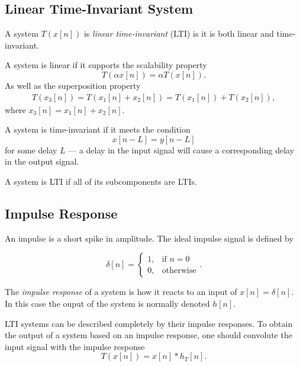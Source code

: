 \documentclass{article}
\def\lsqb{\left[}
\def\rsqb{\right]}
\def\sqb#1{\lsqb #1 \rsqb}
\def\xsig{x\sqb{n}}
\begin{document}
\subsection{Linear Time-Invariant System}

A system $T(x\sqb{n})$ is \textit{linear time-invariant} (LTI) is it is both linear and time-invariant.

A system is linear if it supports the scalability property 
\begin{equation}
    T(\alpha \xsig) = \alpha T(\xsig).
\end{equation}
As well as the superposition property 
\begin{gather}
    T(x_3\sqb{n}) = T(x_1\sqb{n} + x_2\sqb{n}) =  T(x_1\sqb{n}) + T(x_2\sqb{n}), 
\end{gather}
where $x_3\sqb{n} = x_1\sqb{n} + x_2\sqb{n}$.

A system is time-invariant if it meets the condition
\begin{equation}
    x\sqb{n - L} = y\sqb{n - L}
\end{equation}
for some delay $L$ --- a delay in the input signal will cause a corresponding delay in the output signal.

A system is LTI if all of its subcomponents are LTIs.

\subsection{Impulse Response}
An impulse is a short spike in amplitude. The ideal impulse signal is defined by

\begin{equation}
    \delta\sqb{n} =
        \begin{cases}
            1, & \text{if } n = 0 \\
            0, & \text{otherwise}
        \end{cases}.
\end{equation}

The \textit{impulse response} of a system is how it reacts to an input of $\xsig = \delta\sqb{n}$. In this
case the ouput of the system is normally denoted $h\sqb{n}$.

LTI systems can be described completely by their impulse responses. To obtain the output of a system based on an impulse response, one should convolute the input signal with the impulse response
\begin{equation}
    T(\xsig) = \xsig * h_T\sqb{n}.
\end{equation}
\end{document}
